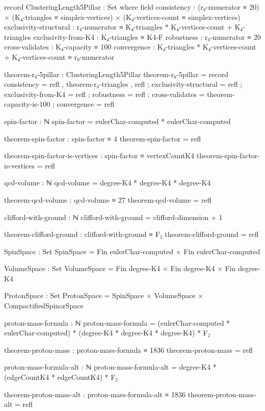 \documentclass[11pt,a4paper]{book}
\begin{document}
\begin{code}
record ClusteringLength5Pillar : Set where
  field
    consistency            : (r₀-numerator ≡ 20) × (K₄-triangles ≡ simplex-vertices) × (K₄-vertices-count ≡ simplex-vertices)
    exclusivity-structural : r₀-numerator ≡ K₄-triangles * K₄-vertices-count + K₄-triangles
    exclusivity-from-K4    : K₄-triangles ≡ K4-F
    robustness             : r₀-numerator ≡ 20
    cross-validates        : K₄-capacity ≡ 100
    convergence            : K₄-triangles * K₄-vertices-count + K₄-vertices-count ≡ r₀-numerator

theorem-r₀-5pillar : ClusteringLength5Pillar
theorem-r₀-5pillar = record
  { consistency            = refl , theorem-r₀-triangles , refl
  ; exclusivity-structural = refl
  ; exclusivity-from-K4    = refl
  ; robustness             = refl
  ; cross-validates        = theorem-capacity-is-100
  ; convergence            = refl
  }

spin-factor : ℕ
spin-factor = eulerChar-computed * eulerChar-computed

theorem-spin-factor : spin-factor ≡ 4
theorem-spin-factor = refl

theorem-spin-factor-is-vertices : spin-factor ≡ vertexCountK4
theorem-spin-factor-is-vertices = refl

qcd-volume : ℕ
qcd-volume = degree-K4 * degree-K4 * degree-K4

theorem-qcd-volume : qcd-volume ≡ 27
theorem-qcd-volume = refl

clifford-with-ground : ℕ
clifford-with-ground = clifford-dimension + 1

theorem-clifford-ground : clifford-with-ground ≡ F₂
theorem-clifford-ground = refl

SpinSpace : Set
SpinSpace = Fin eulerChar-computed × Fin eulerChar-computed

VolumeSpace : Set
VolumeSpace = Fin degree-K4 × Fin degree-K4 × Fin degree-K4

ProtonSpace : Set
ProtonSpace = SpinSpace × VolumeSpace × CompactifiedSpinorSpace

proton-mass-formula : ℕ
proton-mass-formula = (eulerChar-computed * eulerChar-computed) * (degree-K4 * degree-K4 * degree-K4) * F₂

theorem-proton-mass : proton-mass-formula ≡ 1836
theorem-proton-mass = refl

proton-mass-formula-alt : ℕ
proton-mass-formula-alt = degree-K4 * (edgeCountK4 * edgeCountK4) * F₂

theorem-proton-mass-alt : proton-mass-formula-alt ≡ 1836
theorem-proton-mass-alt = refl


\end{code}
\end{document}
